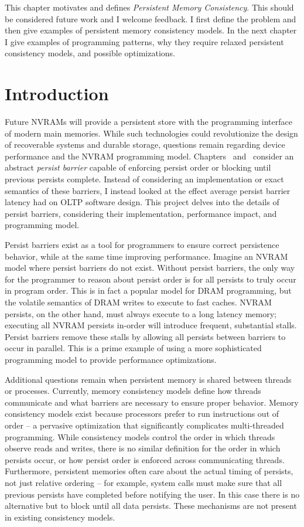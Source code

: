 This chapter motivates and defines \emph{Persistent Memory Consistency}.
This should be considered future work and I welcome feedback.
I first define the problem and then give examples of persistent memory consistency models.
In the next chapter I give examples of programming patterns, why they require relaxed persistent consistency models, and possible optimizations.

\section{Introduction}
\label{sec:PMC:Intro}

Future NVRAMs will provide a persistent store with the programming interface of modern main memories.
While such technologies could revolutionize the design of recoverable systems and durable storage, questions remain regarding device performance and the NVRAM programming model.
Chapters~ and~ consider an abstract \emph{persist barrier} capable of enforcing persist order or blocking until previous persists complete.
Instead of considering an implementation or exact semantics of these barriers, I instead looked at the effect average persist barrier latency had on OLTP software design.
This project delves into the details of persist barriers, considering their implementation, performance impact, and programming model.

Persist barriers exist as a tool for programmers to ensure correct persistence behavior, while at the same time improving performance.
Imagine an NVRAM model where persist barriers do not exist.
Without persist barriers, the only way for the programmer to reason about persist order is for all persists to truly occur in program order.
This is in fact a popular model for DRAM programming, but the volatile semantics of DRAM writes to execute to fast caches.
NVRAM persists, on the other hand, must always execute to a long latency memory; executing all NVRAM persists in-order will introduce frequent, substantial stalls.
Persist barriers remove these stalls by allowing all persists between barriers to occur in parallel.
This is a prime example of using a more sophisticated programming model to provide performance optimizations.

Additional questions remain when persistent memory is shared between threads or processes.
Currently, memory consistency models define how threads communicate and what barriers are necessary to ensure proper behavior.
Memory consistency models exist because processors prefer to run instructions out of order -- a pervasive optimization that significantly complicates multi-threaded programming.
While consistency models control the order in which threads observe reads and writes, there is no similar definition for the order in which persists occur, or how persist order is enforced across communicating threads.
Furthermore, persistent memories often care about the actual timing of persists, not just relative ordering -- for example, system calls must make sure that all previous persists have completed before notifying the user.
In this case there is no alternative but to block until all data persists.
These mechanisms are not present in existing consistency models.

